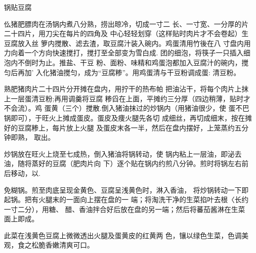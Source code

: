 \begin{recipe}{锅贴豆腐}

\ingredients



\cooking

仫猪肥膘肉在汤锅内煮八分熟，捞出晾冷，切成一寸二 长、一寸宽、一分厚的片二十四片，用刀尖在每片的四角及 中心轻轻划穿（这样贴时肉片才不会卷起）生豆腐放入丝 箩内搅散、滤去渣，取豆腐汁装入碗内。鸡蛋清用竹後在八 寸盘内用力向着一个方向快速搅打，搅打至全部变为雪白成. 团的细泡，将筷子一只插入细泡内不倒时为止。推盐、干豆 粉、面粉、味精和鸡蛋泡都加入豆腐汁的碗内，搅匀后再加' 入化猪油搅匀，成为“豆腐糁”。用鸡蛋清与干豆粉调成蛋: 清豆粉。

\step 熟肥猪肉片二十四片分开摊在盘内，用拧干的热布帕 把油沾干，将每个肉片上抹上一层蛋清豆粉;再用调羹将豆腐 糁舀在上面，平摊约三分厚（四边稍薄，贴时才不会流）。鸡 蛋黄（三个）搅散.倒入猪油抹过的炒锅内（用猪油很少，使 蛋不巴锅即可），于旺火上摊成蛋皮。蛋皮及痩火腿先各切 成细丝，再切成细末，按在摊好的豆腐糁上，每片放上火腿 及蛋皮末各一半，然后在盘内摆好，上笼蒸约五分钟即熟， 取出。

\step 炒锅放在旺火上烧至七成热，倒入猪油将锅转动，使 锅内粘上一层油，即泌去油，随将蒸好的豆腐（肥肉片向 下）逐个贴在锅内约煎八分钟。煎时将锅左右前后移动，以.

免糊锅。煎至肉底呈现金黄色、豆腐呈浅黄色时，淋入香油， 将炒锅转动一下即起锅。把有火腿末的一面向上摆在盘的一 端；将淘洗干净的生菜掐叶去根〈长约一寸二分），用糖、 醋、香油拌合好后放在盘的另一端；然后将蕃茄酱淋在生菜 面上即成。

\notes

此菜在浅黄色豆腐上微微透出火腿及蛋黄皮的红黄两 色，镶以绿色生菜，色调美观，食之松脆香嫩清爽可口。

\end{recipe}

